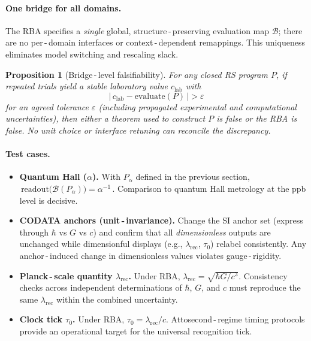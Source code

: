 \documentclass[11pt]{article}
\newcommand{\lamrec}{\lambda_{\mathrm{rec}}}
\newcommand{\tauzero}{\tau_{0}}
\newtheorem{proposition}[theorem]{Proposition}
\theoremstyle{remark}
\begin{document}
\paragraph{One bridge for all domains.}
The RBA specifies a \emph{single} global, structure\,\mbox{-}\,preserving evaluation map $\mathcal B$; there are no per\,\mbox{-}\,domain interfaces or context\,\mbox{-}\,dependent remappings. This uniqueness eliminates model switching and rescaling slack.

\begin{proposition}[Bridge\,\mbox{-}\,level falsifiability]
For any closed RS program $P$, if repeated trials yield a stable laboratory value $c_{\mathrm{lab}}$ with
\[
  \bigl|\,c_{\mathrm{lab}} - \text{evaluate}(P)\,\bigr| > \varepsilon
\]
for an agreed tolerance $\varepsilon$ (including propagated experimental and computational uncertainties), then either a theorem used to construct $P$ is false \emph{or} the RBA is false. No unit choice or interface retuning can reconcile the discrepancy.
\end{proposition}

\paragraph{Test cases.}
\begin{itemize}
  \item \textbf{Quantum Hall (\boldmath$\alpha$).} With $P_{\alpha}$ defined in the previous section,
  \(\,\text{readout}\bigl(\mathcal B(P_{\alpha})\bigr) = \alpha^{-1}\,\). Comparison to quantum Hall metrology at the ppb level is decisive.

  \item \textbf{CODATA anchors (unit\,\mbox{-}\,invariance).} Change the SI anchor set (express through $\hbar$ vs $G$ vs $c$) and confirm that all \emph{dimensionless} outputs are unchanged while dimensionful displays (e.g., $\lamrec$, $\tauzero$) relabel consistently. Any anchor\,\mbox{-}\,induced change in dimensionless values violates gauge\,\mbox{-}\,rigidity.

  \item \textbf{Planck\,\mbox{-}\,scale quantity \boldmath$\lamrec$.} Under RBA, \(\lamrec = \sqrt{\hbar G/ c^{3}}\). Consistency checks across independent determinations of $\hbar$, $G$, and $c$ must reproduce the same $\lamrec$ within the combined uncertainty.

  \item \textbf{Clock tick \boldmath$\tauzero$.} Under RBA, \(\tauzero = \lamrec/ c\). Attosecond\,\mbox{-}\,regime timing protocols provide an operational target for the universal recognition tick.
\end{itemize}
\end{document}
